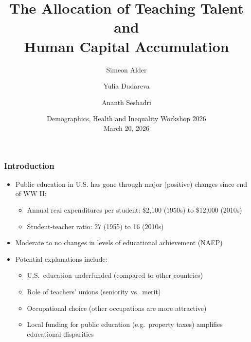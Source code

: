 \documentclass[11pt,hyperref={bookmarks=false},table,aspectratio=169]{beamer}
\title{The Allocation of Teaching Talent and \\Human Capital Accumulation}
\author[shortname]{Simeon Alder\inst{1} \and Yulia Dudareva\inst{2} \and Ananth Seshadri\inst{1}}
\institute[shortinst]{\inst{1} University of Wisconsin--Madison \and \inst{2} Copenhagen Business School}
\date{Demographics, Health and Inequality Workshop 2026\\ \bigskip March 20, 2026}
\begin{document}
	
	\begin{frame}
		\titlepage
	\end{frame}
	
	
	\begin{frame}
		\frametitle{Introduction}
		\begin{itemize}
			\item Public education in U.S. has gone through major (positive) changes since end of WW II:
			\begin{itemize}
				\item Annual real expenditures per student: \$2,100 (1950s) to \$12,000 (2010s)
				\item Student-teacher ratio: 27 (1955) to 16 (2010s)
			\end{itemize}
			\item Moderate to no changes in levels of educational
                achievement (NAEP) 
			\item Potential explanations include:
			\begin{itemize}
				\item U.S.~education underfunded (compared to other countries) \pause
				\item Role of teachers' unions (seniority vs.~merit)\pause
				\item \alert{Occupational choice} (other occupations are more attractive) \pause
				\item Local funding for public education (e.g.~property taxes) amplifies educational disparities
			\end{itemize}
		\end{itemize}
	\end{frame}
	
\end{document}

